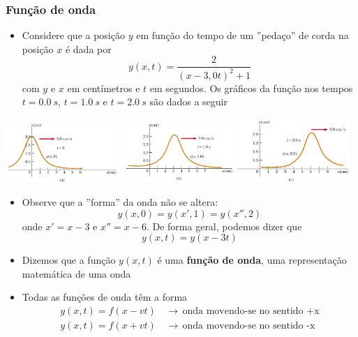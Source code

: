 \documentclass[t,%
brazilian,%
11pt,%
aspectratio=169,%
table%
]{beamer}
\begin{document}
\begin{frame}
    \frametitle{Função de onda}
    \begin{itemize}
        \item Considere que a posição $y$ em função do tempo de um ''pedaço'' de corda na posição $x$ é dada por 
            \[
                y(x,t)=\frac{2}{(x-3,0t)^2+1}
            \]
            com $y$ e $x$ em centímetros e $t$ em segundos. Os gráficos da
            função nos tempos $t=\SI{0.0}{s}$, $t=\SI{1.0}{s}$ e
            $t=\SI{2.0}{s}$ são dados a seguir
    \end{itemize}
    \centering
    \includegraphics[width=0.32\textwidth]{images/t-0}
    \includegraphics[width=0.32\textwidth]{images/t-1}
    \includegraphics[width=0.32\textwidth]{images/t-2}
\end{frame}

\begin{frame}
    \begin{itemize}
        \item Observe que a ''forma'' da onda não se altera:
            \[
                y(x,0) = y(x',1)=y(x'',2)
            \]
            onde $x'=x-3$ e $x''=x-6$. De forma geral, podemos dizer que
            \[
                y(x,t)=y(x-3t)
            \]

        \item Dizemos que a função $y(x,t)$ é uma \textbf{função de onda}, uma
            representação matemática de uma onda
        \item Todas as funções de onda têm a forma
            \begin{align*}
                y(x,t)=f(x-vt) & ~~\rightarrow~~ \text{onda movendo-se no sentido +x}\\
                y(x,t)=f(x+vt) & ~~\rightarrow~~ \text{onda movendo-se no sentido -x}
            \end{align*} 
    \end{itemize}
\end{frame}
\end{document}
